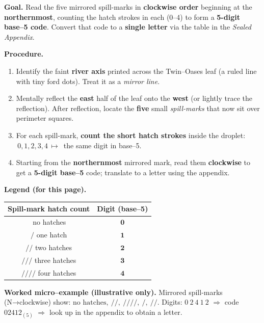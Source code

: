 \documentclass[11pt]{article}
\numberwithin{equation}{section} %
\theoremstyle{plain} %
\theoremstyle{definition} %
\theoremstyle{remark} %
\begin{document}
\medskip
\noindent\textbf{Goal.} Read the five mirrored spill-marks in \textbf{clockwise order} beginning at the \textbf{northernmost}, counting the hatch strokes in each (0–4) to form a \textbf{5-digit base–5 code}. Convert that code to a \textbf{single letter} via the table in the \emph{Sealed Appendix}.

\medskip
\noindent\textbf{Procedure.}
\begin{enumerate}\setlength\itemsep{0.2em}
  \item Identify the faint \textbf{river axis} printed across the Twin–Oases leaf (a ruled line with tiny ford dots). Treat it as a \emph{mirror line}.
  \item Mentally reflect the \textbf{east} half of the leaf onto the \textbf{west} (or lightly trace the reflection). After reflection, locate the \textbf{five} small \emph{spill-marks} that now sit over perimeter squares.
  \item For each spill-mark, \textbf{count the short hatch strokes} inside the droplet: \(\,0,1,2,3,4\,\mapsto\,\) the same digit in base–5.
  \item Starting from the \textbf{northernmost} mirrored mark, read them \textbf{clockwise} to get a \textbf{5-digit base–5} code; translate to a letter using the appendix.
\end{enumerate}

\medskip
\noindent\textbf{Legend (for this page).}
\begin{center}
\begin{tabular}{c|c}
\textbf{Spill-mark hatch count} & \textbf{Digit (base–5)} \\
\hline
\(\,\)no hatches & \(\mathbf{0}\) \\
\(/\) one hatch & \(\mathbf{1}\) \\
\(/\!\!/\) two hatches & \(\mathbf{2}\) \\
\(/\!\!/\!\!/\) three hatches & \(\mathbf{3}\) \\
\(/\!\!/\!\!/\!\!/\) four hatches & \(\mathbf{4}\) \\
\end{tabular}
\end{center}

\medskip
\noindent\textbf{Worked micro–example (illustrative only).}  
Mirrored spill-marks (N→clockwise) show: \(\text{no hatches},\ /\!\!/,\ /\!\!/\!\!/\!\!/,\ /,\ /\!\!/\).  
Digits: \(0\ 2\ 4\ 1\ 2\) \(\Rightarrow\) code \(02412_{(5)}\) \(\Rightarrow\) look up in the appendix to obtain a letter.
\end{document}

